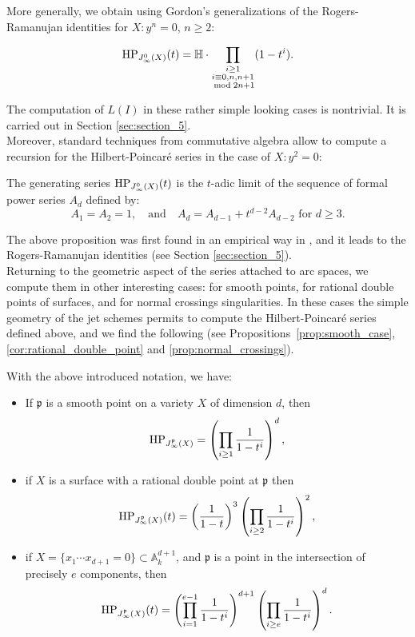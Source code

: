 More generally, we obtain using Gordon's generalizations of the
Rogers-Ramanujan identities for $X\colon y^n=0$, $n\geq 2$:

\begin{samepage}
\begin{Thm*}
\begin{displaymath}
\operatorname{HP}_{J_\infty^0(X)}(t)=\mathbb{H}\cdot
  \prod_{\substack{i\geq 1\\ i \equiv 0, n,n+1 \\ \bmod 2n+1}} (1-t^i).
\end{displaymath}
\end{Thm*}
\end{samepage}

The computation of $L(I)$ in these rather simple
looking cases is nontrivial. It is carried out in Section
\ref{sec:section_5}.\\


Moreover, standard techniques from commutative algebra allow to compute a recursion for the
Hilbert-Poincar\'{e} series in the case of $X\colon y^2=0$:

\begin{Prop*}
The generating series $\operatorname{HP}_{J_{\infty}^{0}(X)}(t)$ is the $t$-adic limit of the sequence of formal power series $A_d$ defined by:
$$A_1=A_2=1, \quad \text{and} \quad A_d = A_{d-1}+t^{d-2} A_{d-2}\text{ for } d\geq 3.$$
\end{Prop*}

The above proposition was first found in an empirical way in
\cite{andrews_baxter}, and it leads to the Rogers-Ramanujan
identities (see Section \ref{sec:section_5}).\\


Returning to the geometric aspect of the series attached to arc spaces, we
compute them in other interesting cases: for smooth
points, for rational double points of surfaces, and for normal
crossings singularities. In these cases the simple geometry of the jet
schemes permits to compute the Hilbert-Poincar\'{e} series defined
above, and we find the following (see
Propositions~\ref{prop:smooth_case}, \ref{cor:rational_double_point}
and \ref{prop:normal_crossings}).

\begin{Prop*} With the above introduced notation, we have:
\begin{itemize}
\item[(1)] If $\mathfrak{p}$ is a smooth point on a variety $X$ of dimension $d$, then 
\[ \operatorname{HP}_{J_{\infty}^{\mathfrak{p}}(X)} = \left(\prod_{i\geq 1} \frac{1}{1-t^i}\right)^d, \]
\item[(2)] if $X$ is a surface with a rational double point at $\mathfrak{p}$ then 
\[ \operatorname{HP}_{J_{\infty}^{\mathfrak{p}}(X)}(t) =  \left(\frac{1}{1-t}\right)^{3} \left(\prod_{i\geq 2} \frac{1}{1-t^i}\right)^2, \]
\item[(3)] if $X= \{ x_1\cdots x_{d+1} = 0\} \subset \mathbb{A}^{d+1}_k$, and $\mathfrak{p}$ is a point in the intersection of precisely $e$ components, then 
\[ \operatorname{HP}_{J_{\infty}^{\mathfrak{p}}(X)}(t) =  \left(\prod_{i=1}^{e-1} \frac{1}{1-t^i}\right)^{d+1} \left(\prod_{i\geq e} \frac{1}{1-t^i}\right)^d. \]
\end{itemize}
\end{Prop*}

